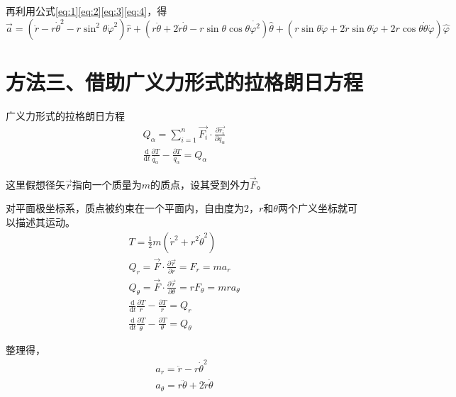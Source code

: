 \documentclass{ctexart}
\begin{document}
    再利用公式\eqref{eq:1}\eqref{eq:2}\eqref{eq:3}\eqref{eq:4}，得
    \begin{equation*}
        \vec{a} = (\ddot{r}-r\dot{\theta}^2-r\sin^2\theta\dot{\varphi}^2)\hat{r}+
        (r\ddot{\theta}+2\dot{r}\dot{\theta}-r\sin\theta\cos\theta\dot{\varphi^2})\hat{\theta}+
        (r\sin\theta\ddot{\varphi}+2\dot{r}\sin\theta\dot{\varphi}+
        2r\cos\theta\dot{\theta}\dot{\varphi})\hat{\varphi}
    \end{equation*}

    \section{方法三、借助广义力形式的拉格朗日方程}\label{sec:4}

    广义力形式的拉格朗日方程
    \begin{gather*}
        Q_{\alpha} = \sum_{i = 1}^{n} \vec{F_i}\cdot\frac{\partial\vec{r_i}}{\partial q_{\alpha}} \\
        \frac{\mathrm{d}}{\mathrm{d}t}\frac{\partial T}{\dot{q_{\alpha}}} -
        \frac{\partial T}{q_{\alpha}} = Q_{\alpha}
    \end{gather*}

    这里假想径矢$\vec{r}$指向一个质量为$m$的质点，设其受到外力$\vec{F}$。

    对平面极坐标系，质点被约束在一个平面内，自由度为2，$r$和$\theta$两个广义坐标就可以描述其运动。
    \begin{gather*}
        T = \frac{1}{2} m (\dot{r}^2+r^2\dot{\theta}^2) \\
        Q_r = \vec{F}\cdot\frac{\partial\vec{r}}{\partial r} = F_r = ma_r \\
        Q_{\theta} = \vec{F}\cdot\frac{\partial\vec{r}}{\partial\theta} = rF_{\theta} = mra_{\theta} \\
        \frac{\mathrm{d}}{\mathrm{d}t}\frac{\partial T}{\dot{r}}-\frac{\partial T}{r} = Q_r \\
        \frac{\mathrm{d}}{\mathrm{d}t}\frac{\partial T}{\dot{\theta}}-
        \frac{\partial T}{\theta} = Q_{\theta}
    \end{gather*}

    整理得，
    \begin{gather*}
        a_r = \ddot{r}-r\dot{\theta}^2 \\
        a_{\theta} = r\ddot{\theta}+2\dot{r}\dot{\theta}
    \end{gather*}
\end{document}
